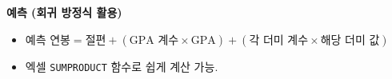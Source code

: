 \documentclass[11pt,a4paper]{article}
\theoremstyle{definition}
\begin{document}
\begin{tcolorbox}[colback=cyan!5!white, colframe=cyan!75!black, title=\textbf{핵심 요약: 다중 범주 더미 변수}]
\textbf{예측 (회귀 방정식 활용)}
\begin{itemize}
    \item $\text{예측 연봉} = \text{절편} + (\text{GPA 계수} \times \text{GPA}) + (\text{각 더미 계수} \times \text{해당 더미 값})$
    \item 엑셀 \texttt{SUMPRODUCT} 함수로 쉽게 계산 가능.
\end{itemize}
\end{tcolorbox}
\end{document}
